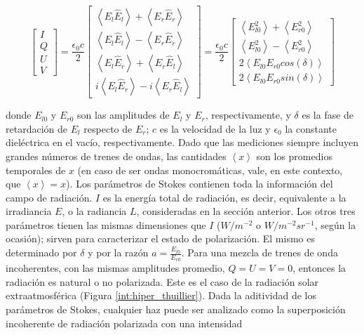        \begin{equation}
        \begin{bmatrix} 
        I \\ Q \\ U \\ V 
        \end{bmatrix}
        =\frac{\epsilon_{0}c}{2}
        \begin{bmatrix}
        \left<{E_{l}\hat{E}_{l}}\right>+\left<{E_{r}\hat{E}_{r}}\right>\\
        \left<{E_{l}\hat{E}_{l}}\right>-\left<{E_{r}\hat{E}_{r}}\right> \\
        \left<{E_{l}\hat{E}_{r}}\right>+\left<{E_{r}\hat{E}_{l}}\right> \\
        i\left<{E_{l}\hat{E}_{r}}\right>-i\left<{E_{r}\hat{E}_{l}}\right> 
        \end{bmatrix}
        =\frac{\epsilon_{0}c}{2}
        \begin{bmatrix}
        \left<{E_{l0}^{2}}\right>+\left<{E_{r0}^{2}}\right>\\
        \left<{E_{l0}^{2}}\right>-\left<{E_{r0}^{2}}\right>\\
        2\left<{E_{l0}E_{r0}cos(\delta)}\right>\\
        2\left<{E_{l0}E_{r0}sin(\delta)}\right>
        \end{bmatrix}
        \label{sos:eq:lenoble5}
        \end{equation}
        
        \noindent donde $E_{l0}$ y $E_{r0}$ son las amplitudes de $E_{l}$ y $E_{r}$, respectivamente, y $\delta$ es la fase de retardación de $E_{l}$ respecto de $E_{r}$; $c$ es la velocidad de la luz y $\epsilon_{0}$ la constante dieléctrica en el vacío, respectivamente. Dado que las mediciones siempre incluyen grandes números de trenes de ondas, las cantidades $\left<{x}\right>$ son los promedios temporales de $x$ (en caso de ser ondas monocromáticas, vale, en este contexto, que $\left<{x}\right>=x$). Los parámetros de Stokes contienen toda la información del campo de radiación. $I$ es la energía total de radiación, es decir, equivalente a la irradiancia $E$, o la radiancia $L$, consideradas en la sección anterior. Los otros tres parámetros tienen las mismas dimensiones que $I$ ($W/m^{-2}$ o $W/m^{-2}sr^{-1}$, según la ocasión); sirven para caracterizar el estado de polarización. El mismo es determinado por $\delta$ y por la razón $a=\frac{E_{l0}}{E_{r0}}$. Para una mezcla de trenes de onda incoherentes, con las mismas amplitudes promedio, $Q=U=V=0$, entonces la radiación es natural o no polarizada. Este es el caso de la radiación solar extraatmosférica (Figura \ref{int:hiper_thuillier}). Dada la aditividad de los parámetros de Stokes, cualquier haz puede ser analizado como la superposición incoherente de radiación polarizada con una intensidad

